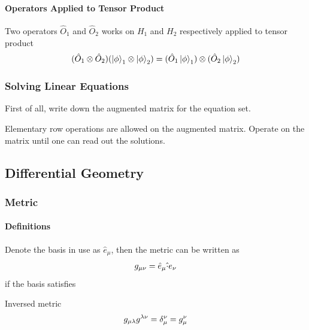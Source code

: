 \documentclass[letterpaper,10pt,english]{sphinxmanual}
\newcommand{\ket}[1]{\left| #1\right\rangle}
\begin{document}
\paragraph{Operators Applied to Tensor Product}
\label{math:operators-applied-to-tensor-product}
Two operators \(\hat O_1\) and \(\hat O_2\) works on \(H_1\) and \(H_2\) respectively applied to tensor product
\begin{gather}
\begin{split}(\hat O_1 \otimes \hat O_2 )( \ket{\phi}_1\otimes \ket{\phi}_2 ) = (\hat O_1 \ket{\phi}_1) \otimes (\hat O_2 \ket{\phi}_2)\end{split}\notag
\end{gather}

\subsubsection{Solving Linear Equations}
\label{math:solving-linear-equations}
First of all, write down the augmented matrix for the equation set.

Elementary row operations are allowed on the augmented matrix. Operate on the matrix until one can read out the solutions.


\subsection{Differential Geometry}
\label{math:differential-geometry}

\subsubsection{Metric}
\label{math:metric}

\paragraph{Definitions}
\label{math:definitions}
Denote the basis in use as \(\hat e_\mu\), then the metric can be written as
\begin{gather}
\begin{split}g_{\mu\nu}=\hat e_\mu \hat \cdot e_\nu\end{split}\notag
\end{gather}
if the basis satisfies

Inversed metric
\begin{gather}
\begin{split}g_{\mu\lambda}g^{\lambda\nu}=\delta_\mu^\nu = g_\mu^\nu\end{split}\notag
\end{gather}
\end{document}
